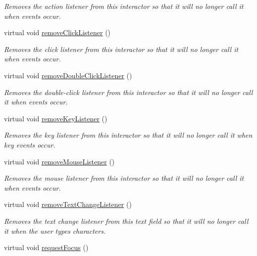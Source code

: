 \begin{DoxyCompactItemize}
\begin{DoxyCompactList}\small\item\em Removes the action listener from this interactor so that it will no longer call it when events occur. \end{DoxyCompactList}\item 
virtual void \mbox{\hyperlink{classsgl_1_1GInteractor_ad39d0325cde6b97ebda4b9d7787c633b}{remove\+Click\+Listener}} ()
\begin{DoxyCompactList}\small\item\em Removes the click listener from this interactor so that it will no longer call it when events occur. \end{DoxyCompactList}\item 
virtual void \mbox{\hyperlink{classsgl_1_1GInteractor_aa4250907e4cdd77349c04f0cf5cdd3d3}{remove\+Double\+Click\+Listener}} ()
\begin{DoxyCompactList}\small\item\em Removes the double-\/click listener from this interactor so that it will no longer call it when events occur. \end{DoxyCompactList}\item 
virtual void \mbox{\hyperlink{classsgl_1_1GInteractor_a43095f41cab3be732b49f29970484b05}{remove\+Key\+Listener}} ()
\begin{DoxyCompactList}\small\item\em Removes the key listener from this interactor so that it will no longer call it when key events occur. \end{DoxyCompactList}\item 
virtual void \mbox{\hyperlink{classsgl_1_1GInteractor_aff47f71ce47e688a07c9d38dc92fcc11}{remove\+Mouse\+Listener}} ()
\begin{DoxyCompactList}\small\item\em Removes the mouse listener from this interactor so that it will no longer call it when events occur. \end{DoxyCompactList}\item 
virtual void \mbox{\hyperlink{classsgl_1_1GTextField_a69c940b99d01eb7c353763ce4b0942a4}{remove\+Text\+Change\+Listener}} ()
\begin{DoxyCompactList}\small\item\em Removes the text change listener from this text field so that it will no longer call it when the user types characters. \end{DoxyCompactList}\item 
virtual void \mbox{\hyperlink{classsgl_1_1GInteractor_a519fb2ac767f8b2febbb50b898b8c8cb}{request\+Focus}} ()

\end{DoxyCompactItemize}
